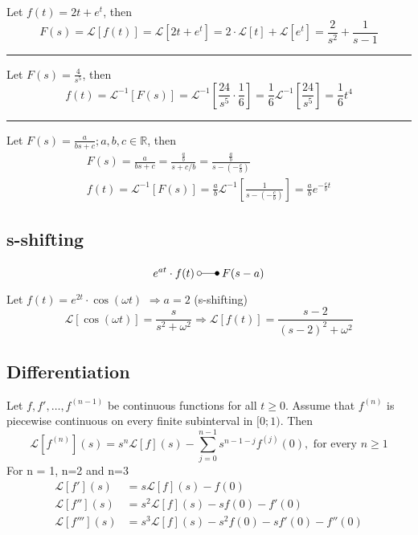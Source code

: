\begin{examplesection}[Example]
    Let $f(t)=2t+e^t$, then
    \begin{equation*}
        F(s)=\mathcal{L}[f(t)]=\mathcal{L}[2t+e^t]=2\cdot\mathcal{L}[t] + \mathcal{L}[e^t]=\frac{2}{s^2}+\frac{1}{s-1}
    \end{equation*}
    \hrule{}
    Let $F(s)=\frac{4}{s^5}$, then
    \begin{equation*}
        f(t)=\mathcal{L}^{-1}[F(s)]=\mathcal{L}^{-1}\left[\frac{24}{s^5}\cdot\frac16\right]=\frac16\mathcal{L}^{-1}\left[\frac{24}{s^5}\right]=\frac16t^4
    \end{equation*}
    \hrule{}
    Let $F(s)=\frac{a}{bs+c}; a,b,c \in \mathbb{R}$, then
    \begin{gather*}
        F(s)=\frac{a}{bs+c}=\frac{\frac{a}{b}}{s+c/b}=\frac{\frac{a}{b}}{s-(-\frac{c}{b})} \\
        f(t)=\mathcal{L}^{-1}[F(s)]=\frac{a}{b}\mathcal{L}^{-1}\left[\frac{1}{s-(-\frac{c}{b})}\right]=\frac{a}{b}e^{-\frac{c}{b}t}
    \end{gather*}
\end{examplesection}

\subsection{s-shifting}
\noindent
\begin{equation*}
    e^{at}\cdot f(t)\:\laplace\:F(s-a)
\end{equation*}
\begin{examplesection}[Example]
    Let $f(t)=e^{2t}\cdot \cos(\omega t)$ $\Rightarrow a=2$ (s-shifting)
    \begin{equation*}
        \mathcal{L}[\cos(\omega t)]=\frac{s}{s^2+\omega ^2}\Rightarrow \mathcal{L}[f(t)]=\frac{s-2}{{(s-2)}^2+\omega ^2}
    \end{equation*}
\end{examplesection}

\subsection{Differentiation}\label{ssec:laplaceDiff}
Let $f, f', \dots, f^{(n-1)}$ be continuous functions for all $t \geq 0$. Assume that $f^{(n)}$ is piecewise continuous on every finite subinterval in $[0;1)$. Then %
\begin{equation*}
    \mathcal{L}[f^{(n)}](s)=s^n\mathcal{L}[f](s)-\sum_{j=0}^{n-1}s^{n-1-j}f^{(j)}(0),\text{ for every }n\geq1
\end{equation*}
For n = 1, n=2 and n=3
\begin{align*}
    \mathcal{L}[f'](s)   & =s\mathcal{L}[f](s)-f(0)                    \\
    \mathcal{L}[f''](s)  & =s^2\mathcal{L}[f](s)-sf(0)-f'(0)           \\
    \mathcal{L}[f'''](s) & =s^3\mathcal{L}[f](s)-s^2f(0)-sf'(0)-f''(0) %
\end{align*}

